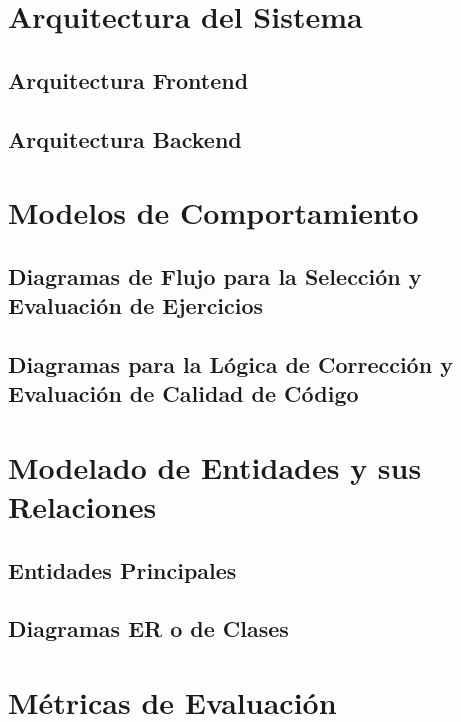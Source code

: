 \section{Arquitectura del Sistema}

\subsection{Arquitectura Frontend}

\subsection{Arquitectura Backend}

\section{Modelos de Comportamiento}

\subsection{Diagramas de Flujo para la Selección y Evaluación de Ejercicios}

\subsection{Diagramas para la Lógica de Corrección y Evaluación de Calidad de Código}

\section{Modelado de Entidades y sus Relaciones}

\subsection{Entidades Principales}

\subsection{Diagramas ER o de Clases}

\section{Métricas de Evaluación}
